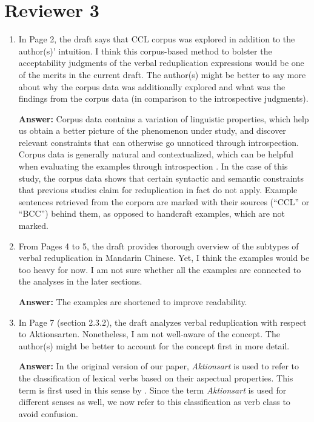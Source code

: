 \documentclass[fleqn,twoside]{article}
\begin{document}
\section{Reviewer 3}

\begin{enumerate}
\item
In Page 2, the draft says that CCL corpus was explored in addition to the author(s)’ intuition. I think this corpus-based method to bolster the acceptability judgments of the verbal reduplication expressions would be one of the merits in the current draft. The author(s) might be better to say more about why the corpus data was additionally explored and what was the findings from the corpus data (in comparison to the introspective judgments).

\textbf{Answer:}
 Corpus data contains a variation of linguistic properties, which help us obtain a better picture of the phenomenon under study,
 and discover relevant constraints that can otherwise go unnoticed through introspection.
 Corpus data is generally natural and contextualized, which can be helpful when evaluating the examples through introspection \citep[921]{MM2009a}.
 In the case of this study, the corpus data shows that certain syntactic and semantic constraints that previous studies claim for reduplication in fact do not apply.
Example sentences retrieved from the corpora are marked with their sources (``CCL'' or ``BCC'') behind them,
as opposed to handcraft examples, which are not marked.

\item
From Pages 4 to 5, the draft provides thorough overview of the subtypes of verbal reduplication in Mandarin Chinese. Yet, I think the examples would be too heavy for now. I am not sure whether all the examples are connected to the analyses in the later sections.

\textbf{Answer:} The examples are shortened to improve readability.

\item 
In Page 7 (section 2.3.2), the draft analyzes verbal reduplication with respect to Aktionsarten. Nonetheless, I am not well-aware of the concept. The author(s) might be better to account for the concept first in more detail.

\textbf{Answer:} 
In the original version of our paper, \textit{Aktionsart} is used to refer to the classification of lexical verbs based on their aspectual properties.
This term is first used in this sense by \citet{Agrell1908}.%
Since the term \textit{Aktionsart} is used for different senses as well,
we now refer to this classification as verb class to avoid confusion.


\end{enumerate}
\end{document}
